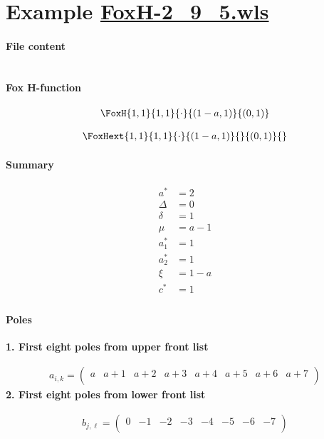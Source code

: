 \documentclass[11pt]{article}
\begin{document}
\section{Example \url{FoxH-2_9_5.wls}}

\paragraph{File content}

\inputminted{text}{FoxH-2_9_5.wls}

\paragraph{Fox H-function}

\begin{align*}
  \FoxH
    {1,1}
    {1,1}
    {\cdot}
    {\left(1-a, 1\right)}
    {\left(0, 1\right)}
\end{align*}

\begin{align*}
  \FoxHext
    {1,1}
    {1,1}
    {\cdot}
    {\left(1-a, 1\right)}
    {}
    {\left(0, 1\right)}
    {}
\end{align*}

\paragraph{Summary}

\begin{align*}
  a^*    & = 2 \\
  \Delta & = 0 \\
  \delta & = 1 \\
  \mu    & = a-1 \\
  a_1^*  & = 1 \\
  a_2^*  & = 1 \\
  \xi    & = 1-a \\
  c^*    & = 1 \\
\end{align*}

\paragraph{Poles}

\noindent\textbf{1. First eight poles from upper front list}

\begin{align*}
  a_{i,k} = 
  \left(
\begin{array}{cccccccc}
 a & a+1 & a+2 & a+3 & a+4 & a+5 & a+6 & a+7 \\
\end{array}
\right)
\end{align*}
\noindent\textbf{2. First eight poles from lower front list}

\begin{align*}
  b_{j,\ell} = 
  \left(
\begin{array}{cccccccc}
 0 & -1 & -2 & -3 & -4 & -5 & -6 & -7 \\
\end{array}
\right)
\end{align*}

\printbibliography[title={References}]
\end{document}
